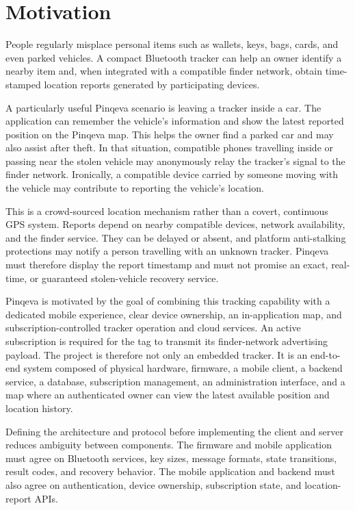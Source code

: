 \documentclass[12pt,a4paper]{article}
\begin{document}
\section*{Motivation}

People regularly misplace personal items such as wallets, keys, bags, cards,
and even parked vehicles. A compact Bluetooth tracker can help an owner identify
a nearby item and, when integrated with a compatible finder network, obtain
time-stamped location reports generated by participating devices.

A particularly useful Pinqeva scenario is leaving a tracker inside a car. The
application can remember the vehicle's information and show the latest reported
position on the Pinqeva map. This helps the owner find a parked car and may also
assist after theft. In that situation, compatible phones travelling inside or
passing near the stolen vehicle may anonymously relay the tracker's signal to
the finder network. Ironically, a compatible device carried by someone moving
with the vehicle may contribute to reporting the vehicle's location.

This is a crowd-sourced location mechanism rather than a covert, continuous GPS
system. Reports depend on nearby compatible devices, network availability, and
the finder service. They can be delayed or absent, and platform anti-stalking
protections may notify a person travelling with an unknown tracker. Pinqeva
must therefore display the report timestamp and must not promise an exact,
real-time, or guaranteed stolen-vehicle recovery service.

Pinqeva is motivated by the goal of combining this tracking capability with a
dedicated mobile experience, clear device ownership, an in-application map, and
subscription-controlled tracker operation and cloud services. An active
subscription is required for the tag to transmit its finder-network advertising
payload. The project is therefore not only
an embedded tracker. It is an end-to-end system composed of physical hardware,
firmware, a mobile client, a backend service, a database, subscription
management, an administration interface, and a map where an authenticated
owner can view the latest available position and location history.

Defining the architecture and protocol before implementing the client and
server reduces ambiguity between components. The firmware and mobile
application must agree on Bluetooth services, key sizes, message formats,
state transitions, result codes, and recovery behavior. The mobile application
and backend must also agree on authentication, device ownership, subscription
state, and location-report APIs.
\end{document}
